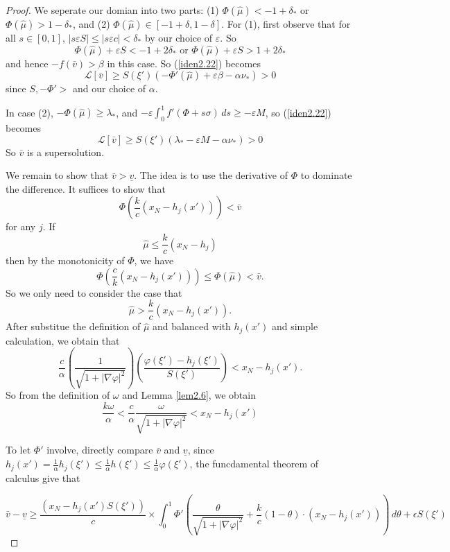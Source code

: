 \documentclass[12pt, a4paper]{article}
\numberwithin{equation}{section}
\renewcommand{\L}{\mathcal{L}}
\newcommand{\hmu}{\hat{\mu}}
\begin{document}
\begin{CJK}{UTF8}{bkai}
\begin{proof}
We seperate our domian into two parts: (1) $\Phi(\hmu)<-1+\delta_*$ or $\Phi(\hmu)>1-\delta_*$, and (2) $\Phi(\hmu)\in[-1+\delta,1-\delta]$.
For (1), first observe that for all $s\in[0,1]$, $|s\varepsilon S|\leq |s\varepsilon c|<\delta_*$ by our choice of $\varepsilon$. So
\[
	\Phi(\hmu)+\varepsilon S<-1+2\delta_*\mbox{ or }\Phi(\hmu)+\varepsilon S>1+2\delta_*
\]
and hence $-f(\bar{v})>\beta$ in this case. So (\ref{iden2.22}) becomes
\[
	\L[\bar{v}]\geq S(\xi')\left(-\Phi'(\hmu)+\varepsilon\beta-\alpha\nu_*\right)>0
\]
since $S,-\Phi'>$ and our choice of $\alpha$.

In case (2), $-\Phi(\hmu)\geq\lambda_*$, and $-\varepsilon\int_0^1f'(\Phi+s\sigma)\,ds\geq-\varepsilon M$, so (\ref{iden2.22}) becomes
\[
	\L[\bar{v}]\geq S(\xi')\left(\lambda_*-\varepsilon M-\alpha\nu_*\right)>0
\]
So $\bar{v}$ is a supersolution.


	We remain to show that $\bar{v}>\underline{v}$. The idea is to use the derivative of $\Phi$ to dominate the difference. It suffices to show that
\begin{equation}
	\Phi\left(\frac{k}{c}(x_N-h_j(x'))\right)<\bar{v}
\end{equation}
for any $j$. If 
\[
	\hmu\leq \frac{k}{c}(x_N-h_j)
\]
then by the monotonicity of $\Phi$, we have
\[
	\Phi\left(\frac{c}{k}(x_N-h_j(x'))\right)\leq\Phi(\hmu)<\bar{v}.
\]
So we only need to consider the case that
\[
	\hmu>\frac{k}{c}(x_N-h_j(x')).
\]
After substitue the definition of $\hmu$ and balanced with $h_j(x')$ and simple calculation, we obtain that
\[
	\frac{c}{\alpha}\left(\frac{1}{\sqrt{1+|\nabla\varphi|^2}}\right)\left(\frac{\varphi(\xi')-h_j(\xi')}{S(\xi')}\right)<x_N-h_j(x').
\]
So from the definition of $\omega$ and Lemma \ref{lem2.6}, we obtain
\begin{equation}\label{iden2.25}
	\frac{k\omega}{\alpha}<\frac{c}{\alpha}\frac{\omega}{\sqrt{1+|\nabla\varphi|^2}}<x_N-h_j(x')
\end{equation}

To let $\Phi'$ involve, directly compare $\bar{v}$ and $\underline{v}$,  since $h_j(x')=\frac{1}{\alpha}h_j(\xi')\leq\frac{1}{\alpha}h(\xi')\leq\frac{1}{\alpha}\varphi(\xi')$, the funcdamental theorem of calculus give that

\[
	\bar{v}-\underline{v}\geq\frac{(x_N-h_j(x')S(\xi'))}{c}\times\int_0^1\Phi'\left(\frac{\theta}{\sqrt{1+|\nabla\varphi|^2}}+\frac{k}{c}(1-\theta)\cdot(x_N-h_j(x'))\right)\,d\theta+\epsilon S(\xi')
\]


\end{proof}
\end{CJK}
\end{document}
